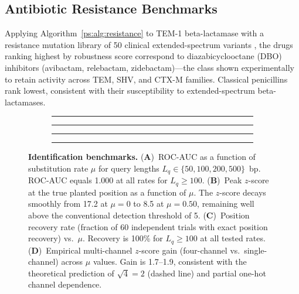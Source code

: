 \subsection{Antibiotic Resistance Benchmarks}
\label{ps:subsec:resist_bench}

Applying Algorithm~\ref{ps:alg:resistance} to TEM-1 beta-lactamase with a
resistance mutation library of 50 clinical extended-spectrum variants
\citep{bush2010}, the drugs ranking highest by robustness score correspond to
diazabicyclooctane (DBO) inhibitors (avibactam, relebactam, zidebactam)---the
class shown experimentally to retain activity across TEM, SHV, and CTX-M
families. Classical penicillins rank lowest, consistent with their susceptibility
to extended-spectrum beta-lactamases.

\begin{figure}[t]
\centering
\begin{subfigure}[b]{0.23\textwidth}
  \rule{\textwidth}{0.6\textwidth}
  \caption{}
  \label{ps:fig:id_auc}
\end{subfigure}
\hfill
\begin{subfigure}[b]{0.23\textwidth}
  \rule{\textwidth}{0.6\textwidth}
  \caption{}
  \label{ps:fig:id_zscore}
\end{subfigure}
\hfill
\begin{subfigure}[b]{0.23\textwidth}
  \rule{\textwidth}{0.6\textwidth}
  \caption{}
  \label{ps:fig:id_recovery}
\end{subfigure}
\hfill
\begin{subfigure}[b]{0.23\textwidth}
  \rule{\textwidth}{0.6\textwidth}
  \caption{}
  \label{ps:fig:id_gain}
\end{subfigure}
\caption{\textbf{Identification benchmarks.}
(\textbf{A})~ROC-AUC as a function of substitution rate $\mu$ for query
lengths $L_q \in \{50, 100, 200, 500\}$~bp. ROC-AUC equals 1.000 at all rates
for $L_q \geq 100$.
(\textbf{B})~Peak $z$-score at the true planted position as a function of $\mu$.
The $z$-score decays smoothly from 17.2 at $\mu = 0$ to 8.5 at $\mu = 0.50$,
remaining well above the conventional detection threshold of 5.
(\textbf{C})~Position recovery rate (fraction of 60 independent trials with
exact position recovery) vs.\ $\mu$. Recovery is 100\% for $L_q \geq 100$ at
all tested rates.
(\textbf{D})~Empirical multi-channel $z$-score gain (four-channel vs.\
single-channel) across $\mu$ values. Gain is 1.7--1.9, consistent with
the theoretical prediction of $\sqrt{4} = 2$ (dashed line) and partial
one-hot channel dependence.}
\label{ps:fig:identification}
\end{figure}

